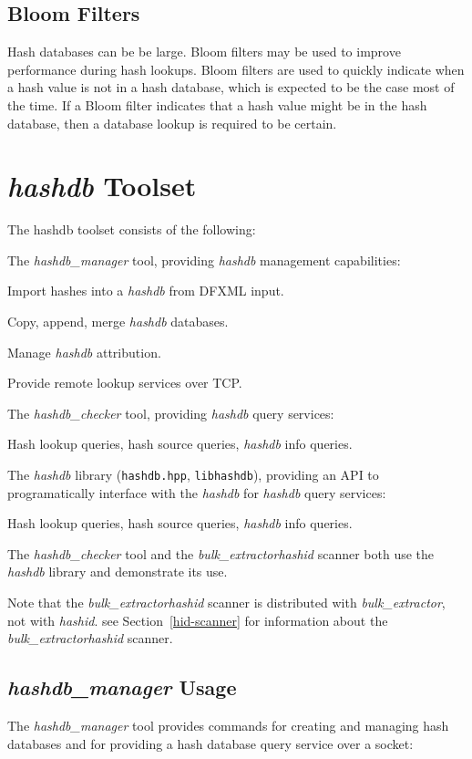 \documentclass[11pt,twoside]{article}
\newcommand \bulk {\textit{bulk\_extractor}\xspace}
\newcommand \hdb {\textit{hashdb}\xspace}
\newcommand \hdbm {\textit{hashdb\_manager}\xspace}
\newcommand \hdbc {\textit{hashdb\_checker}\xspace}
\newcommand \hid {\textit{hashid}\xspace}
\begin{document}
\subsection{Bloom Filters}
Hash databases can be be large.
Bloom filters may be used to improve performance during hash lookups.
Bloom filters are used to quickly indicate when a hash value
is not in a hash database,
which is expected to be the case most of the time.
If a Bloom filter indicates that a hash value might be in the hash database,
then a database lookup is required to be certain.

\section{\hdb Toolset}
The hashdb toolset consists of the following:
\begin{compactitem}
\item The \hdbm tool, providing \hdb management capabilities:
\begin{compactitem}
\item Import hashes into a \hdb from DFXML input.
\item Copy, append, merge \hdb databases.
\item Manage \hdb attribution.
\item Provide remote lookup services over TCP.
\end{compactitem}
\item The \hdbc tool, providing \hdb query services:
\begin{compactitem}
\item Hash lookup queries, hash source queries, \hdb info queries.
\end{compactitem}
\item The \hdb library (\texttt{hashdb.hpp}, \texttt{libhashdb}),
providing an API to programatically interface with the \hdb
for \hdb query services:
\begin{compactitem}
\item Hash lookup queries, hash source queries, \hdb info queries.
\item The \hdbc tool and the \bulk \hid scanner both use the \hdb library
and demonstrate its use.

Note that the \bulk \hid scanner is distributed with \bulk, not with \hid.
see Section~\ref{hid-scanner} for information about the \bulk \hid scanner.
\end{compactitem}
\end{compactitem}

\subsection{\hdbm Usage}
The \hdbm tool provides commands for creating and managing hash databases
and for providing a hash database query service over a socket:
\end{document}
